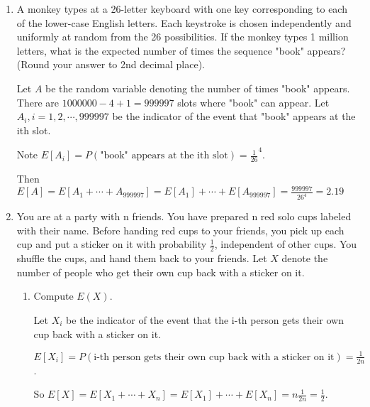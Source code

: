 \documentclass[11pt,preview]{standalone} %
\date{} %
\begin{document}

\begin{enumerate}
\item A monkey types at a 26-letter keyboard with one key corresponding to each of the lower-case English letters. Each keystroke is chosen independently and uniformly at random from the 26 possibilities. If the monkey types 1 million letters, what is the expected number of times the sequence "book" appears? (Round your answer to 2nd decimal place).
\begin{Freeform}{2.19}
\Solution 
Let $A$ be the random variable denoting the number of times "book" appears. There are $1000000 - 4 + 1 = 999997$ slots where "book" can appear. Let $A_i, i=1, 2, \cdots, 999997$ be the indicator of the event that "book" appears at the ith slot. 

Note $E[A_i] = P(\text{"book" appears at the ith slot}) = \frac{1}{26}^4$.

Then $E[A] = E[A_1 + \cdots + A_{999997}] = E[A_1] + \cdots + E[A_{999997}] = \frac{999997}{26^4} = 2.19$
\end{Freeform}


\item You are at a party with n friends. You have prepared n red solo cups labeled with their name. Before handing red cups to your friends, you pick up each cup and put a sticker on it with probability $\frac{1}{2}$, independent of other cups. You shuffle the cups, and hand them back to your friends. Let $X$ denote the number of people who get their own cup back with a sticker on it.

\begin{enumerate}
\item Compute $E(X)$.
\begin{Freeform}{0.5}
\Solution Let $X_i$ be the indicator of the event that the i-th person gets their own cup back with a sticker on it. 

$E[X_i] = P(\text{i-th person gets their own cup back with a sticker on it}) = \frac{1}{2n}$.

So $E[X] = E[X_1 + \cdots + X_{n}] = E[X_1] + \cdots + E[X_n] = n \frac{1}{2n} = \frac{1}{2}$.

\end{Freeform}



\end{enumerate}
\end{enumerate}
\end{document}
